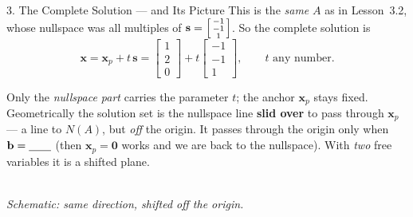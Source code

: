 \documentclass[10pt]{article}
\newcommand{\xx}{\mathbf{x}}
\newcommand{\bb}{\mathbf{b}}
\newcommand{\svec}{\mathbf{s}}
\newcommand{\zero}{\mathbf{0}}
\begin{document}
\begin{notesbox}{3. The Complete Solution --- and Its Picture}
This is the \emph{same} $A$ as in Lesson~3.2, whose nullspace was all multiples of
$\svec=\begin{bsmallmatrix} -1\\-1\\1 \end{bsmallmatrix}$. So the complete solution is
\[
  \xx=\xx_p+t\,\svec
   =\begin{bmatrix} 1\\2\\0 \end{bmatrix}+t\begin{bmatrix} -1\\-1\\1 \end{bmatrix}, \qquad t \text{ any number}.
\]
\begin{minipage}[t]{0.60\linewidth}\vspace{2pt}
Only the \emph{nullspace part} carries the parameter $t$; the anchor $\xx_p$ stays fixed. Geometrically
the solution set is the nullspace line \textbf{slid over} to pass through $\xx_p$ --- a line
\blank{2.2cm} to $N(A)$, but \emph{off} the origin. It passes through the origin only when
$\bb=\blank{0.7cm}$ (then $\xx_p=\zero$ works and we are back to the nullspace). With \emph{two} free
variables it is a shifted plane.
\end{minipage}\hfill
\begin{minipage}[t]{0.36\linewidth}\vspace{0pt}\centering
{}\\[-2pt]
{\scriptsize\itshape Schematic: same direction, shifted off the origin.}
\end{minipage}
\end{notesbox}
\end{document}
